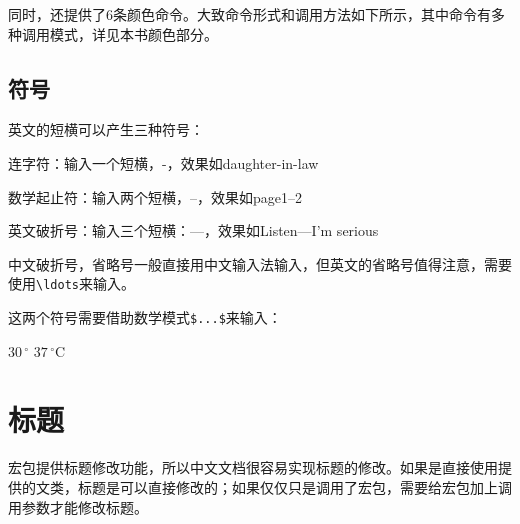 \begin{latex}{}
\CJKunderdotbasesep
\CJKunderlinebasesep
\CJKunderdbllinebasesep
\CJKunderwavebasesep
\renewcommand{\CJKunderlinebasesep}{0.5em}
\end{latex}

同时，还提供了6条颜色命令。大致命令形式和调用方法如下所示，其中命令有多种调用模式，详见本书颜色部分。

\begin{latex}{}
\CJKunderlinecolor
\renewcommand{\CJKunderline}{\color{blue}}
\end{latex}

\subsection{符号}


英文的短横可以产生三种符号：\par

\begin{compactitem}[\textbullet]
	\item 连字符：输入一个短横，-，效果如daughter-in-law
	\item 数学起止符：输入两个短横，--，效果如page1--2
	\item 英文破折号：输入三个短横：---，效果如Listen---I'm serious
\end{compactitem}

中文破折号，省略号一般直接用中文输入法输入，但英文的省略号值得注意，需要使用\verb|\ldots|来输入。

这两个符号需要借助数学模式\verb|$...$|来输入：
\begin{codeshow}
	$30\,^{\circ}$
	$37\,^{\circ}\mathrm{C}$
\end{codeshow}

\section{标题}

\CTeX 宏包提供标题修改功能，所以中文文档很容易实现标题的修改。如果是直接使用\CTeX 提供的文类，标题是可以直接修改的；如果仅仅只是调用了\CTeX 宏包，需要给宏包加上调用参数才能修改标题。

\begin{latex}{}
\usepackage[
heading=true,%
]{ctex}
\end{latex}







